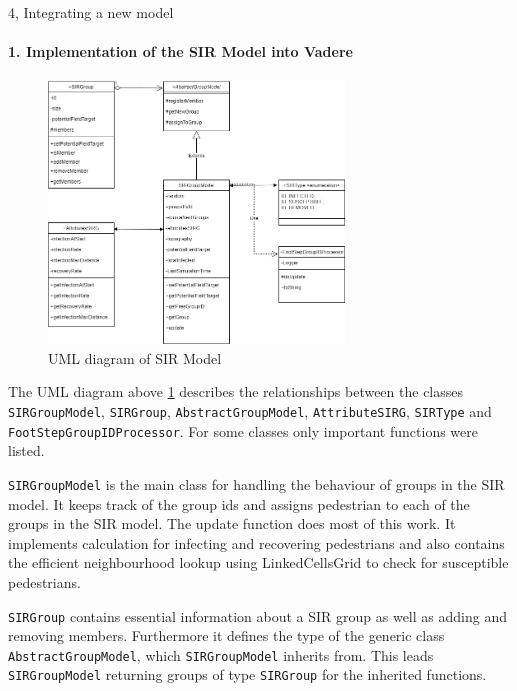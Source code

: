 \begin{task}{4, Integrating a new model}

\paragraph{1. Implementation of the SIR Model into Vadere}

\begin{figure}[H]
\centering
\includegraphics[width=0.7\textwidth]{report-template/images/taask4.1.png}
\caption{UML diagram of SIR Model}
\label{fig:fig4uml}
\end{figure}
The UML diagram above \ref{fig:fig4uml} describes the relationships between the classes \verb+SIRGroupModel+, \verb+SIRGroup+, \verb+AbstractGroupModel+, \verb+AttributeSIRG+, \verb+SIRType+ and \verb+FootStepGroupIDProcessor+. For some classes only important functions were listed.
\begin{description}
    \item \verb+SIRGroupModel+ is the main class for handling the behaviour of groups in the SIR model. It keeps track of the group ids and assigns pedestrian to each of the groups in the SIR model. The update function does most of this work. It implements calculation for infecting and recovering pedestrians and also contains the efficient neighbourhood lookup using LinkedCellsGrid to check for susceptible pedestrians.
    \item \verb+SIRGroup+ contains essential information about a SIR group as well as adding and removing members. Furthermore it defines the type of the generic class \verb+AbstractGroupModel+, which \verb+SIRGroupModel+ inherits from. This leads \verb+SIRGroupModel+ returning groups of type \verb+SIRGroup+ for the inherited functions. 

\end{description}
\end{task}
